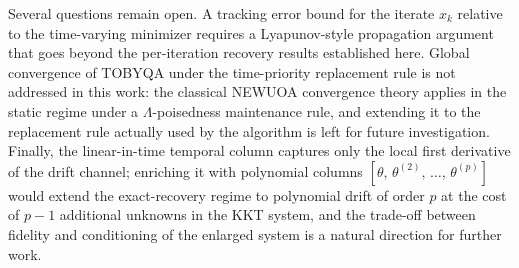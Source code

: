 \documentclass[11pt,a4paper]{article}
\begin{document}
Several questions remain open. A tracking error bound for the
iterate $x_k$ relative to the time-varying minimizer requires a
Lyapunov-style propagation argument that goes beyond the
per-iteration recovery results established here. Global
convergence of TOBYQA under the time-priority replacement rule is
not addressed in this work: the classical NEWUOA convergence
theory applies in the static regime under a $\Lambda$-poisedness
maintenance rule, and extending it to the replacement rule
actually used by the algorithm is left for future investigation.
Finally, the linear-in-time temporal column captures only the
local first derivative of the drift channel; enriching it with
polynomial columns
$[\theta,\,\theta^{(2)},\,\dots,\,\theta^{(p)}]$ would extend
the exact-recovery regime to polynomial drift of order $p$ at
the cost of $p - 1$ additional unknowns in the KKT system, and
the trade-off between fidelity and conditioning of the enlarged
system is a natural direction for further work.
\end{document}
